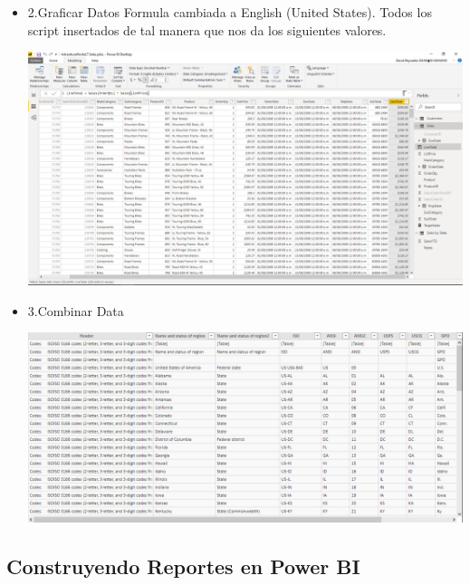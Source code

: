 \begin{itemize}
 \item 2.Graficar Datos
Formula cambiada a English (United States). Todos los script insertados de tal manera que nos da los siguientes valores.
	\begin{center}
	\includegraphics[width=18cm]{./Imagenes/I3}
	\end{center}	

 \item 3.Combinar Data

	\begin{center}
	\includegraphics[width=18cm]{./Imagenes/i4}
	\end{center}	
\end{itemize}

\subsection {Construyendo Reportes en Power BI}

